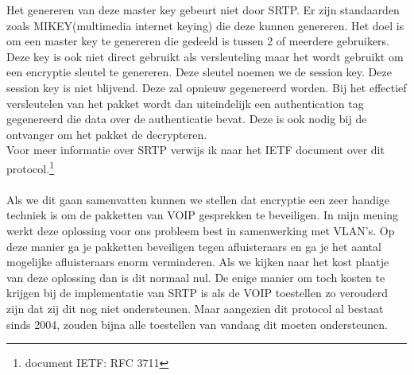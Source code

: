 \documentclass[pdftex,a4paper,12pt,twoside]{report}
\begin{document}
Het genereren van deze master key gebeurt niet door SRTP. Er zijn standaarden zoals MIKEY(multimedia internet keying) die deze kunnen genereren. Het doel is om een master key te genereren die gedeeld is tussen 2 of meerdere gebruikers. Deze key is ook niet direct gebruikt als versleuteling maar het wordt gebruikt om een encryptie sleutel te genereren. Deze sleutel noemen we de session key. Deze session key is niet blijvend. Deze zal opnieuw gegenereerd worden. Bij het effectief versleutelen van het pakket wordt dan uiteindelijk een authentication tag gegenereerd die data over de authenticatie bevat. Deze is ook nodig bij de ontvanger om het pakket de decrypteren. \\ Voor meer informatie over SRTP verwijs ik naar het IETF document over dit protocol.\footnote{document IETF: RFC 3711}
\\ \\
Als we dit gaan samenvatten kunnen we stellen dat encryptie een zeer handige techniek is om de pakketten van VOIP gesprekken te beveiligen. In mijn mening werkt deze oplossing voor ons probleem best in samenwerking met VLAN's. Op deze manier ga je pakketten beveiligen tegen afluisteraars en ga je het aantal mogelijke afluisteraars enorm verminderen. Als we kijken naar het kost plaatje van deze oplossing dan is dit normaal nul. De enige manier om toch kosten te krijgen bij de implementatie van SRTP is als de VOIP toestellen zo verouderd zijn dat zij dit nog niet ondersteunen. Maar aangezien dit protocol al bestaat sinds 2004, zouden bijna alle toestellen van vandaag dit moeten ondersteunen.


\newpage
\end{document}
